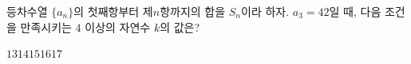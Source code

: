 등차수열 $\{a_n\}$의 첫째항부터 제$n$항까지의 합을 $S_n$이라 하자. $a_3=42$일 때, 다음 조건을 만족시키는 $4$ 이상의 자연수 $k$의 값은? 
\begin{choices32}{$13$}{$14$}{$15$}{$16$}{$17$}\end{choices32}
